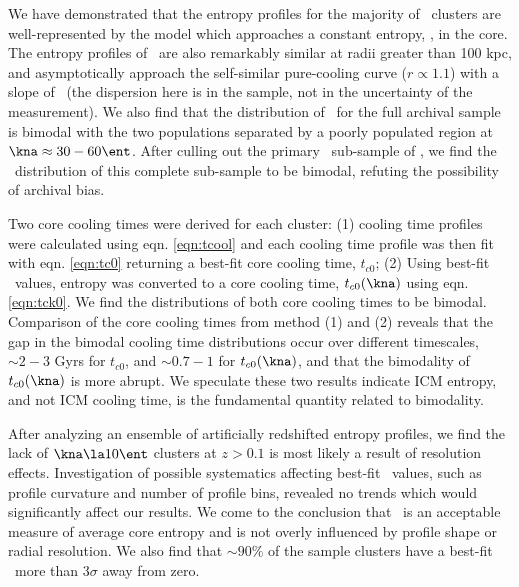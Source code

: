 We have demonstrated that the entropy profiles for the majority of
\accept\ clusters are well-represented by the model which approaches a
constant entropy, \kna, in the core. The entropy profiles of
\accept\ are also remarkably similar at radii greater than 100 kpc,
and asymptotically approach the self-similar pure-cooling curve ($r
\propto 1.1$) with a slope of \alphafs\ (the dispersion here is in the
sample, not in the uncertainty of the measurement). We also find that
the distribution of \kna\ for the full archival sample is bimodal with
the two populations separated by a poorly populated region at $\kna
\approx 30-60 \ent$. After culling out the primary \hifl\ sub-sample
of \citet{hiflugcs1}, we find the \kna\ distribution of this complete
sub-sample to be bimodal, refuting the possibility of archival bias.

Two core cooling times were derived for each cluster: (1) cooling time
profiles were calculated using eqn. \ref{eqn:tcool} and each cooling
time profile was then fit with eqn. \ref{eqn:tc0} returning a best-fit
core cooling time, $t_{c0}$; (2) Using best-fit \kna\ values, entropy
was converted to a core cooling time, $t_{c0}(\kna)$ using
eqn. \ref{eqn:tck0}. We find the distributions of both core cooling
times to be bimodal. Comparison of the core cooling times from method
(1) and (2) reveals that the gap in the bimodal cooling time
distributions occur over different timescales, $\sim 2-3$ Gyrs for
$t_{c0}$, and $\sim 0.7-1$ for $t_{c0}(\kna)$, and that the bimodality
of $t_{c0}(\kna)$ is more abrupt. We speculate these two results
indicate ICM entropy, and not ICM cooling time, is the fundamental
quantity related to bimodality.

After analyzing an ensemble of artificially redshifted entropy
profiles, we find the lack of $\kna \la 10 \ent$ clusters at $z > 0.1$
is most likely a result of resolution effects. Investigation of
possible systematics affecting best-fit \kna\ values, such as profile
curvature and number of profile bins, revealed no trends which would
significantly affect our results. We come to the conclusion that
\kna\ is an acceptable measure of average core entropy and is not
overly influenced by profile shape or radial resolution. We also find
that $\sim90\%$ of the sample clusters have a best-fit \kna\ more than
$3\sigma$ away from zero.

